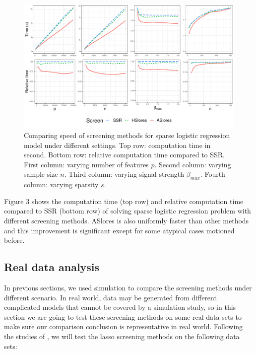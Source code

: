 \begin{figure}[H]
    \centering
    \includegraphics[scale = 0.59]{plots/bin1.pdf}    \caption{Comparing speed of screening methods for sparse logistic regression model under different settings. Top row: computation time in second. Bottom row: relative computation time compared to SSR. First column: varying number of features $p$. Second column: varying sample size $n$. Third column: varying signal strength $\beta_{max}$. Fourth column: varying sparsity $s$.}
    \label{fig:5.1.2}
\end{figure}

Figure 3 shows the computation time (top row) and relative computation time compared to SSR (bottom row) of solving sparse logistic regression problem with different screening methods. ASlores is also uniformly faster than other methods and this improvement is significant except for some atypical cases motioned before.


\subsection{Real data analysis}
\label{sec:real-data}

In previous sections, we used simulation to compare the screening methods under different scenario. In real world, data may be generated from different complicated models that cannot be covered by a simulation study, so in this section we are going to test these screening methods on some real data sets to make sure our comparison conclusion is representative in real world. Following the studies of \citep{wang2013lasso, xiang2016screening, zeng2017efficient}, we will test the lasso screening methods on the following data sets:

